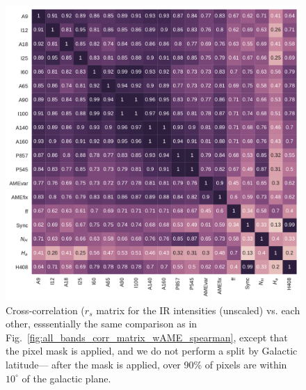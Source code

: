               \begin{figure}
                 \includegraphics[width=\textwidth]{../Plots/ch_allsky/all_bands_corr_matrix_wAME_spearmanintensity_maskall.pdf}
                 \centering
                 \caption{Cross-correlation ($r_{s}$ matrix for the IR intensities (unscaled) vs. each other, esssentially the same comparison as in Fig.~\ref{fig:all_bands_corr_matrix_wAME_spearman}, except that the pixel mask is applied, and we do not perform a split by Galactic latitude--- after the mask is applied, over 90\% of pixels are within $10^{\circ}$ of the galactic plane.}
                 \label{fig:all_bands_corr_matrix_wAME_spearmanintensity_maskall}
              \end{figure}

